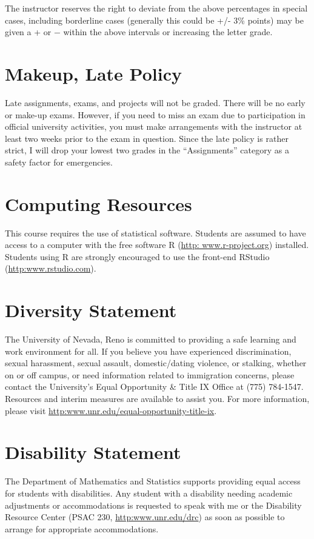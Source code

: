 \documentclass[11pt,onecolumn]{article}
\begin{document}
The instructor reserves the right to deviate from the above percentages in special cases, including borderline cases (generally this could be +/- 3\% points) may be given a + or − within the above intervals or increasing the letter grade.

\section*{Makeup, Late Policy}
Late assignments, exams, and projects will not be graded. There will be no early or make-up exams. However, if you need to miss an exam due to participation in official university activities, you must make arrangements with the instructor at least two weeks prior to the exam in question. Since the late policy is rather strict, I will drop your lowest two grades in the ``Assignments'' category as a safety factor for emergencies.

\section*{Computing Resources}
This course requires the use of statistical software. Students are assumed to have access to a computer with the free software R (\url{http: www.r-project.org}) installed. Students using R are strongly encouraged to use the front-end RStudio (\url{http:www.rstudio.com}).

\section*{Diversity Statement}
The University of Nevada, Reno is committed to providing a safe learning and work environment for all. If you believe you have experienced discrimination, sexual harassment, sexual assault, domestic/dating violence, or stalking, whether on or off campus, or need information related to immigration concerns, please contact the University’s Equal Opportunity \& Title IX Office at (775) 784-1547. Resources and interim measures are available to assist you. For more information, please visit \url{http:www.unr.edu/equal-opportunity-title-ix}.

\section*{Disability Statement}
The Department of Mathematics and Statistics supports providing equal access for students with disabilities. Any student with a disability needing academic adjustments or accommodations is requested to speak with me or the Disability Resource Center (PSAC 230, \url{http:www.unr.edu/drc}) as soon as possible to arrange for appropriate accommodations.
\end{document}
